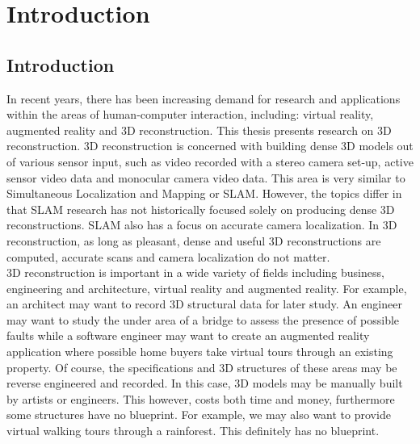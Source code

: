\makeatletter
\chapter{Introduction}

\section{Introduction}

In recent years, there has been increasing demand for research and applications within the areas of human-computer interaction, including: virtual reality, augmented reality and 3D reconstruction. This thesis presents research on 3D reconstruction. 3D reconstruction is concerned with building dense 3D models out of various sensor input, such as video recorded with a stereo camera set-up, active sensor video data and monocular camera video data. This area is very similar to Simultaneous Localization and Mapping or SLAM. However, the topics differ in that SLAM research has not historically focused solely on producing dense 3D reconstructions. SLAM also has a focus on accurate camera localization. In 3D reconstruction, as long as pleasant, dense and useful 3D reconstructions are computed, accurate scans and camera localization do not matter. \\

3D reconstruction is important in a wide variety of fields including business, engineering and architecture, virtual reality and augmented reality. For example, an architect may want to record 3D structural data for later study. An engineer may want to study the under area of a bridge to assess the presence of possible faults while a software engineer may want to create an augmented reality application where possible home buyers take virtual tours through an existing property. Of course, the specifications and 3D structures of these areas may be reverse engineered and recorded. In this case, 3D models may be manually built by artists or engineers. This however, costs both time and money, furthermore some structures have no blueprint. For example, we may also want to provide virtual walking tours through a rainforest. This definitely has no blueprint. \\


